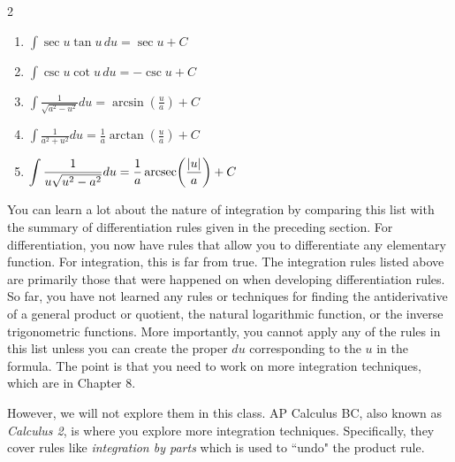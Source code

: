 \documentclass[12pt, letterpaper]{article}
\DeclareMathOperator{\arcsec}{arcsec}
\begin{document}
\begin{definition}[title=Basic Integration Rules ($a>0$)]
\begin{multicols}{2}
\begin{enumerate}
    \item $\displaystyle \int \sec u \tan u\,du
    = \sec u + C$
    
    \item $\displaystyle \int \csc u \cot u\,du
    = -\csc u + C$
    
    \item $\displaystyle \int \frac{1}{\sqrt{a^{2}-u^{2}}}du
    = \arcsin\!\left(\frac{u}{a}\right)+C$
    
    \item $\displaystyle \int \frac{1}{a^{2}+u^{2}}du
    = \frac{1}{a}\arctan\!\left(\frac{u}{a}\right)+C$
    
    \item $\displaystyle \int \frac{1}{u\sqrt{u^{2}-a^{2}}}du
    \\= \frac{1}{a}\arcsec\!\left(\frac{|u|}{a}\right)+C$
    \end{enumerate}
    \end{multicols}

\end{definition}

You can learn a lot about the nature of integration by comparing this list with the summary of differentiation rules given in the preceding section. For differentiation, you now have rules that allow you to differentiate any elementary function. For integration, this is far from true.
The integration rules listed above are primarily those that were happened on when developing differentiation rules. So far, you have not learned any rules or techniques for finding the antiderivative of a general product or quotient, the natural logarithmic function, or the inverse trigonometric functions. More importantly, you cannot apply any of the rules in this list unless you can create the proper $du$ corresponding to the $u$ in the formula. The point is that you need to work on more integration techniques, which are in Chapter 8. 

However, we will not explore them in this class. AP Calculus BC, also known as \textit{Calculus 2}, is where you explore more integration techniques. Specifically, they cover rules like \textit{integration by parts} which is used to ``undo" the product rule.
\end{document}
